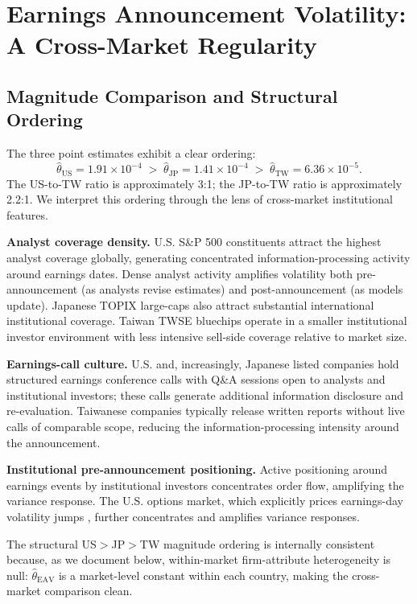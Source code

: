 \documentclass[12pt,a4paper]{article}
\begin{document}
\section{Earnings Announcement Volatility: A Cross-Market Regularity}
\label{sec:regularity}

\subsection{Magnitude Comparison and Structural Ordering}

The three point estimates exhibit a clear ordering:
\[
\hat{\theta}_{\mathrm{US}} = 1.91\times10^{-4}
\;>\;
\hat{\theta}_{\mathrm{JP}} = 1.41\times10^{-4}
\;>\;
\hat{\theta}_{\mathrm{TW}} = 6.36\times10^{-5}.
\]
The US-to-TW ratio is approximately 3:1; the JP-to-TW ratio is
approximately 2.2:1. We interpret this ordering through the lens of
cross-market institutional features.

\textbf{Analyst coverage density.} U.S. S\&P 500 constituents attract
the highest analyst coverage globally, generating concentrated
information-processing activity around earnings dates. Dense analyst
activity amplifies volatility both pre-announcement (as analysts revise
estimates) and post-announcement (as models update). Japanese TOPIX
large-caps also attract substantial international institutional coverage.
Taiwan TWSE bluechips operate in a smaller institutional investor
environment with less intensive sell-side coverage relative to market size.

\textbf{Earnings-call culture.} U.S. and, increasingly, Japanese listed
companies hold structured earnings conference calls with Q\&A sessions
open to analysts and institutional investors; these calls generate
additional information disclosure and re-evaluation. Taiwanese companies
typically release written reports without live calls of comparable scope,
reducing the information-processing intensity around the announcement.

\textbf{Institutional pre-announcement positioning.} Active positioning
around earnings events by institutional investors concentrates order flow,
amplifying the variance response. The U.S. options market, which explicitly
prices earnings-day volatility jumps \citep{patell_wolfson1979}, further
concentrates and amplifies variance responses.

The structural US$>$JP$>$TW magnitude ordering is internally consistent
because, as we document below, within-market firm-attribute heterogeneity
is null: $\hat{\theta}_{\mathrm{EAV}}$ is a market-level constant within
each country, making the cross-market comparison clean.
\end{document}
